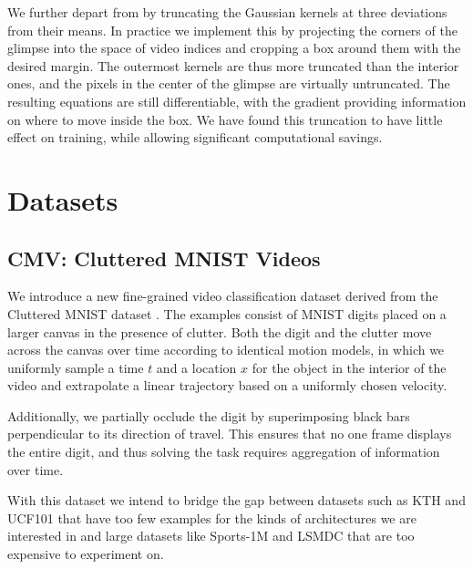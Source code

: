 \documentclass{article} %
\begin{document}
We further depart from \cite{draw} by truncating the Gaussian kernels at three deviations from their means.
In practice we implement this by projecting the corners of the glimpse into the space of video indices and cropping a box around them with the desired margin.
The outermost kernels are thus more truncated than the interior ones, and the pixels in the center of the glimpse are virtually untruncated.
The resulting equations are still differentiable, with the gradient providing information on where to move inside the box.
We have found this truncation to have little effect on training, while allowing significant computational savings.

\section{Datasets}
\subsection{CMV: Cluttered MNIST Videos}

We introduce a new fine-grained video classification dataset derived from the Cluttered MNIST dataset \cite{clutteredmnist}.
The examples consist of MNIST digits placed on a larger canvas in the presence of clutter.
Both the digit and the clutter move across the canvas over time according to identical motion models, in which we uniformly sample a time $t$ and a location $x$ for the object in the interior of the video and extrapolate a linear trajectory based on a uniformly chosen velocity.

Additionally, we partially occlude the digit by superimposing black bars perpendicular to its direction of travel.
This ensures that no one frame displays the entire digit, and thus solving the task requires aggregation of information over time.

With this dataset we intend to bridge the gap between datasets such as KTH \cite{kth} and UCF101 \cite{ucf101} that have too few examples for the kinds of architectures we are interested in and large datasets like Sports-1M \cite{sports1m} and LSMDC \cite{lsmdc} that are too expensive to experiment on.
\end{document}

